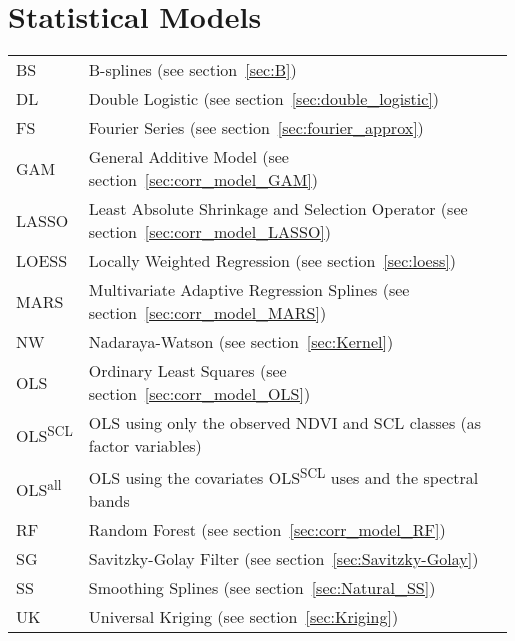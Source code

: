 \section*{Statistical Models}\vspace{-0.3cm}
\begin{longtable}{p{0.12\linewidth} p{0.87\linewidth}}
	BS & B-splines (see section~\ref{sec:B})\\
	DL & Double Logistic (see section~\ref{sec:double_logistic})\\
	FS & Fourier Series (see section~\ref{sec:fourier_approx})\\
	GAM & General Additive Model (see section~\ref{sec:corr_model_GAM})\\
	LASSO & Least Absolute Shrinkage and Selection Operator (see section~\ref{sec:corr_model_LASSO})\\
	LOESS & Locally Weighted Regression (see section~\ref{sec:loess})\\
	MARS & Multivariate Adaptive Regression Splines (see section~\ref{sec:corr_model_MARS})\\
	NW & Nadaraya-Watson (see section~\ref{sec:Kernel})\\
	OLS & Ordinary Least Squares (see section~\ref{sec:corr_model_OLS})\\
	OLS\textsuperscript{SCL} & OLS using only the observed NDVI and SCL classes (as factor variables)\\
	OLS\textsuperscript{all} & OLS using the covariates OLS\textsuperscript{SCL} uses and the spectral bands\\
	RF & Random Forest (see section~\ref{sec:corr_model_RF})\\
	SG & Savitzky-Golay Filter (see section~\ref{sec:Savitzky-Golay})\\
	SS & Smoothing Splines (see section~\ref{sec:Natural_SS})\\
	UK & Universal Kriging (see section~\ref{sec:Kriging})\\
\end{longtable} \renewcommand{\arraystretch}{1}












